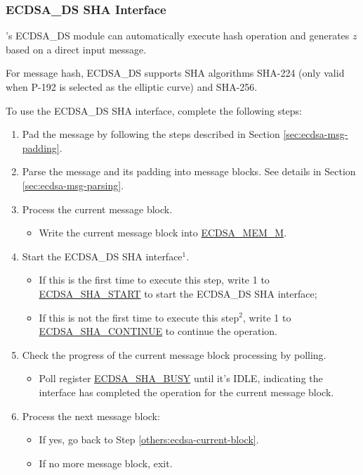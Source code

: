 \documentclass[main\_\_EN.tex]{subfiles}
\begin{document}
\subsubsection{ECDSA\_DS SHA Interface}
\label{sec:ecdsa-sha-interface}
\chipseries{}'s ECDSA\_DS module can automatically execute hash operation and generates $z$ based on a direct input message.

For message hash, ECDSA\_DS supports SHA algorithms SHA-224 (only valid when P-192 is selected as the elliptic curve) and SHA-256.

To use the ECDSA\_DS SHA interface, complete the following steps:

\begin{enumerate}
	\item Pad the message by following the steps described in Section \ref{sec:ecdsa-msg-padding}.
	\item Parse the message and its padding into message blocks. See details in Section \ref{sec:ecdsa-msg-parsing}.
	\item \label{others:ecdsa-current-block} Process the current message block.
	      \begin{itemize}
		      \item Write the current message block into \hyperref[tab:ecdsa-memory]{ECDSA\_MEM\_M}.
	      \end{itemize}
	\item Start the ECDSA\_DS SHA interface\hyperref[others:ecdsa-note-sha]{$^1$}.
	      \begin{itemize}
		      \item If this is the first time to execute this step, write 1 to \hyperref[fielddesc:ECDSASHASTART]{ECDSA\_SHA\_START} to start the ECDSA\_DS SHA interface;
		      \item If this is not the first time to execute this step\hyperref[others:ecdsa-note-sha]{$^2$}, write 1 to \hyperref[fielddesc:ECDSASHACONTINUE]{ECDSA\_SHA\_CONTINUE} to continue the operation.
	      \end{itemize}
	\item Check the progress of the current message block processing by polling.
	      \begin{itemize}
		      \item Poll register \hyperref[fielddesc:ECDSASHABUSY]{ECDSA\_SHA\_BUSY} until it's IDLE, indicating the interface has completed the operation for the current message block.
	      \end{itemize}

	\item Process the next message block:
	      \begin{itemize}
		      \item If yes, go back to Step \ref{others:ecdsa-current-block}.
		      \item If no more message block, exit.
	      \end{itemize}

\end{enumerate}
\end{document}
